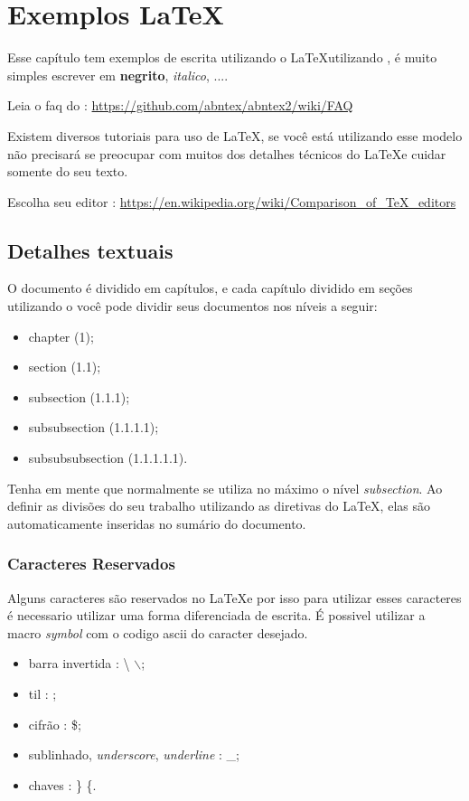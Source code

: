 \chapter{Exemplos \LaTeX}

Esse capítulo tem exemplos de escrita utilizando o \LaTeX  utilizando \abnTeX, é muito simples escrever em \textbf{negrito}, \emph{italico}, ....

Leia o \ac{faq} do \abnTeX : \href{url}{https://github.com/abntex/abntex2/wiki/FAQ}

Existem diversos tutoriais para uso de \LaTeX, se você está utilizando esse modelo não precisará se preocupar com muitos dos detalhes técnicos do \LaTeX  e cuidar somente do seu texto.

Escolha seu editor : \href{url}{https://en.wikipedia.org/wiki/Comparison\_of\_TeX\_editors}


\section{Detalhes textuais}

O documento é dividido em capítulos, e cada capítulo dividido em seções utilizando o \abnTeX você pode dividir seus documentos nos níveis a seguir:

\begin{itemize}
\item chapter (1);
\item section (1.1);
\item subsection (1.1.1);
\item subsubsection (1.1.1.1);
\item subsubsubsection (1.1.1.1.1).
\end{itemize}

Tenha em mente que normalmente se utiliza no máximo o nível \emph{subsection}.
Ao definir as divisões do seu trabalho utilizando as diretivas do \LaTeX, elas são automaticamente inseridas no sumário do documento.

\subsection{Caracteres Reservados}



Alguns caracteres são reservados no \LaTeX e por isso para utilizar esses caracteres é necessario utilizar uma forma diferenciada de escrita. É possivel utilizar a macro \emph{symbol} com o codigo ascii do caracter desejado.
\begin{itemize}
\item barra invertida : \textbackslash   {}    $\backslash$;
\item til  :   ;
\item cifrão : \$;
\item sublinhado, \emph{underscore}, \emph{underline} : \_;
\item chaves : \} \{.
\end{itemize}



